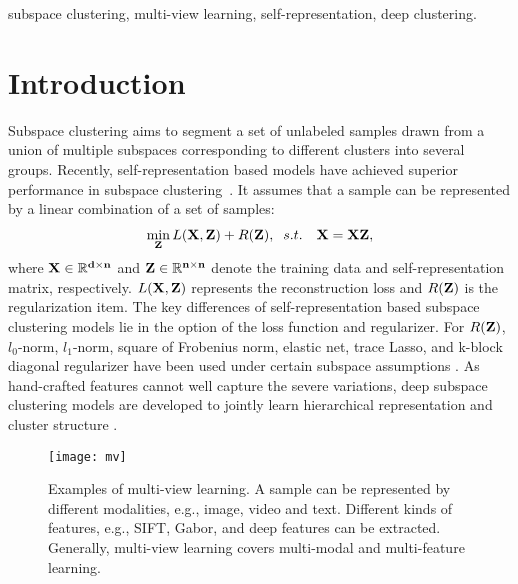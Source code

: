 \documentclass[journal]{IEEEtran}
\begin{document}
\begin{IEEEkeywords}
subspace clustering, multi-view learning, self-representation, deep clustering.
\end{IEEEkeywords}


\section{Introduction}
Subspace clustering aims to segment a set of unlabeled samples drawn from a union of multiple subspaces corresponding to different clusters into several groups.
Recently, self-representation based models have achieved superior performance in subspace clustering~\cite{Guangcan2013Robust,ji2017deep,Zhou2018DeepAS}. It assumes that a sample can be represented by a linear combination of a set of samples:
\begin{equation}\label{sr}
  \begin{array}{l}
\mathop {\min }\limits_{\bf{Z}} L({\bf{X}},{\bf{Z}}) + R({\bf{Z}}),\; \; s.t.\quad{\bf{X}} = {\bf{XZ}},
\end{array}
\end{equation}
where $\bf{X} \in \mathbb{R}^{d \times n}$ and $\bf{Z} \in \mathbb{R}^{n \times n}$ denote the training data and self-representation matrix, respectively.
$L({\bf{X}},{\bf{Z}})$ represents the reconstruction loss and $R({\bf{Z}})$ is the regularization item.
The key differences of self-representation based subspace clustering models lie in the option of the loss function and regularizer.
For $R({\bf{Z}})$, $l_0$-norm, $l_1$-norm, square of Frobenius norm, elastic net, trace Lasso, and k-block diagonal regularizer have been used under certain subspace assumptions \cite{Lu2018Subspace}.
As hand-crafted features cannot well capture the severe variations, deep subspace clustering models are developed to jointly learn hierarchical representation and cluster structure \cite{Chen2017UnsupervisedMC,Tian2017DeepClusterAG,Jiang2018WhenTL,Zhou2018DeepAS,Peng2018StructuredAF,Guo2017ImprovedDE,Li2017ProjectiveLS,Chellappa2018DeepDC,Liang2018SubGANAU,Lezama2018OLEOL}.  

\begin{figure}
	\centering
	\texttt{[image: mv]}
	\caption{Examples of multi-view learning.
A sample can be represented by different modalities, e.g., image, video and text.
Different kinds of features, e.g., SIFT, Gabor, and deep features can be extracted.
Generally, multi-view learning covers multi-modal and multi-feature learning. }
	\label{mv}
\end{figure}
\end{document}

